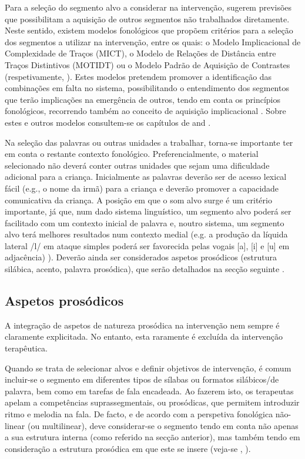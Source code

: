 \documentclass[output=paper,colorlinks,citecolor=brown,booklanguage=portuguese]{langscibook}
\begin{document}
Para a seleção do segmento alvo a considerar na intervenção, \citet{Elbert1986} sugerem previsões que possibilitam a aquisição de outros segmentos não trabalhados diretamente. Neste sentido, existem modelos fonológicos que propõem critérios para a seleção dos segmentos a utilizar na intervenção, entre os quais: o Modelo Implicacional de Complexidade de Traços (MICT), o Modelo de Relações de Distância entre Traços Distintivos (MOTIDT) ou o Modelo Padrão de Aquisição de Contrastes (respetivamente, \citealp{Duarte2006, Mota1996, LazzarottoVolcao2009}). Estes modelos pretendem promover a identificação das combinações em falta no sistema, possibilitando o entendimento dos segmentos que terão implicações na emergência de outros, tendo em conta os princípios fonológicos, recorrendo também ao conceito de aquisição implicacional \citep{KeskeSoares2001, KeskeSoares1996}. Sobre estes e outros modelos consultem-se os capítulos de  and .

Na seleção das palavras ou outras unidades a trabalhar, torna-se importante ter em conta o restante contexto fonológico. Preferencialmente, o material selecionado não deverá conter outras unidades que sejam uma dificuldade adicional para a criança. Inicialmente as palavras deverão ser de acesso lexical fácil (e.g., o nome da irmã) para a criança e deverão promover a capacidade comunicativa da criança. A posição em que o som alvo surge é um critério importante, já que, num dado sistema linguístico, um segmento alvo poderá ser facilitado com um contexto inicial de palavra e, noutro sistema, um segmento alvo terá melhores resultados num contexto medial (e.g. a produção da líquida lateral /l/ em ataque simples poderá ser favorecida pelas vogais [a], [i] e [u] em adjacência) \citealp{MatzenauerHernandorena1997}). Deverão ainda ser considerados aspetos prosódicos (estrutura silábica, acento, palavra prosódica), que serão detalhados na secção seguinte \citep{Mota2001, Grunwell1990}.

\subsection{Aspetos prosódicos}

A integração de aspetos de natureza prosódica na intervenção nem sempre é claramente explicitada. No entanto, esta raramente é excluída da intervenção te\-rapêutica. 

Quando se trata de selecionar alvos e definir objetivos de intervenção, é comum incluir-se o segmento em diferentes tipos de sílabas ou formatos silábicos/de palavra, bem como em tarefas de fala encadeada. Ao fazerem isto, os terapeutas apelam a competências suprassegmentais, ou prosódicas, que permitem introduzir ritmo e melodia na fala. De facto, e de acordo com a perspetiva fonológica não-linear (ou multilinear), deve considerar-se o segmento tendo em conta não apenas a sua estrutura interna (como referido na secção anterior), mas também tendo em consideração a estrutura prosódica em que este se insere (veja-se , ).
\end{document}
